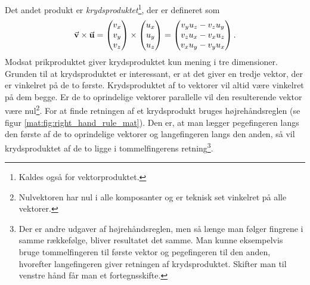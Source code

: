 Det andet produkt er {\em krydsproduktet}\footnote{Kaldes også for vektorproduktet.},
der er defineret som
%
\begin{align} \label{mat:eq:krydsprodukt}
    \va{v} \times \va{u} =
    \begin{pmatrix}
    v_x\\v_y\\v_z
    \end{pmatrix}
    \times
    \begin{pmatrix}
    u_x\\u_y\\u_z
    \end{pmatrix}
    =
    \begin{pmatrix}
    v_yu_z-v_zu_y\\v_zu_x-v_xu_z\\v_xu_y-v_yu_x
    \end{pmatrix}.
\end{align}
%
Modsat prikproduktet giver krydsproduktet kun mening i tre dimensioner.
Grunden til at krydsproduktet er interessant, er at det giver en tredje vektor, der er vinkelret på de to første.
Krydsproduktet af to vektorer vil altid være vinkelret på dem begge. Er de to oprindelige vektorer parallelle vil den resulterende vektor være nul\footnote{Nulvektoren har nul i alle komposanter og er teknisk set vinkelret på alle vektorer.}.
For at finde retningen af et krydsprodukt bruges højrehåndsreglen (se figur \ref{mat:fig:right_hand_rule_mat}). Den er, at man lægger pegefingeren langs den første af de to oprindelige vektorer og langefingeren langs den anden, så vil krydsproduktet af de to ligge i tommelfingerens retning\footnote{Der er andre udgaver af højrehåndsreglen, men så længe man følger fingrene i samme rækkefølge, bliver resultatet det samme. Man kunne eksempelvis bruge tommelfingeren til første vektor og pegefingeren til den anden, hvorefter langefingeren giver retningen af krydsproduktet. Skifter man til venstre hånd får man et fortegnsskifte.}.
%
